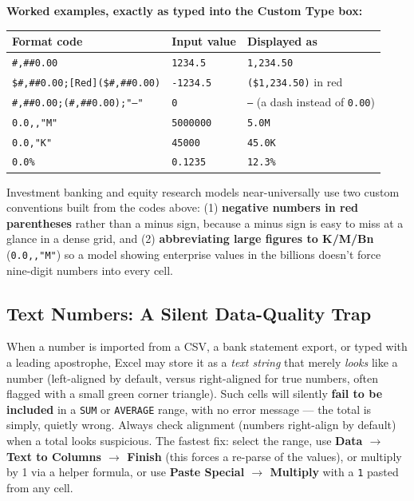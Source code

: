 \documentclass[11pt,a4paper]{article}
\begin{document}
\textbf{Worked examples, exactly as typed into the Custom Type box:}

\begin{center}
\begin{tabular}{@{}p{4.6cm}p{2.4cm}p{4.6cm}@{}}
\toprule
\textbf{Format code} & \textbf{Input value} & \textbf{Displayed as} \\
\midrule
\texttt{\#,\#\#0.00} & \texttt{1234.5} & \texttt{1,234.50} \\
\texttt{\$\#,\#\#0.00;[Red](\$\#,\#\#0.00)} & \texttt{-1234.5} & \texttt{(\$1,234.50)} in red \\
\texttt{\#,\#\#0.00;(\#,\#\#0.00);"--"} & \texttt{0} & \texttt{--} (a dash instead of \texttt{0.00}) \\
\texttt{0.0,,"M"} & \texttt{5000000} & \texttt{5.0M} \\
\texttt{0.0,"K"} & \texttt{45000} & \texttt{45.0K} \\
\texttt{0.0\%} & \texttt{0.1235} & \texttt{12.3\%} \\
\bottomrule
\end{tabular}
\end{center}

\begin{financeapp}
Investment banking and equity research models near-universally use two custom conventions built from the codes above: (1) \textbf{negative numbers in red parentheses} rather than a minus sign, because a minus sign is easy to miss at a glance in a dense grid, and (2) \textbf{abbreviating large figures to K/M/Bn} (\texttt{0.0,,"M"}) so a model showing enterprise values in the billions doesn't force nine-digit numbers into every cell.
\end{financeapp}

\subsection{Text Numbers: A Silent Data-Quality Trap}

\begin{pitfall}
When a number is imported from a CSV, a bank statement export, or typed with a leading apostrophe, Excel may store it as a \emph{text string} that merely \emph{looks} like a number (left-aligned by default, versus right-aligned for true numbers, often flagged with a small green corner triangle). Such cells will silently \textbf{fail to be included} in a \texttt{SUM} or \texttt{AVERAGE} range, with no error message --- the total is simply, quietly wrong. Always check alignment (numbers right-align by default) when a total looks suspicious. The fastest fix: select the range, use \textbf{Data $\rightarrow$ Text to Columns $\rightarrow$ Finish} (this forces a re-parse of the values), or multiply by 1 via a helper formula, or use \textbf{Paste Special $\rightarrow$ Multiply} with a \texttt{1} pasted from any cell.
\end{pitfall}
\end{document}

